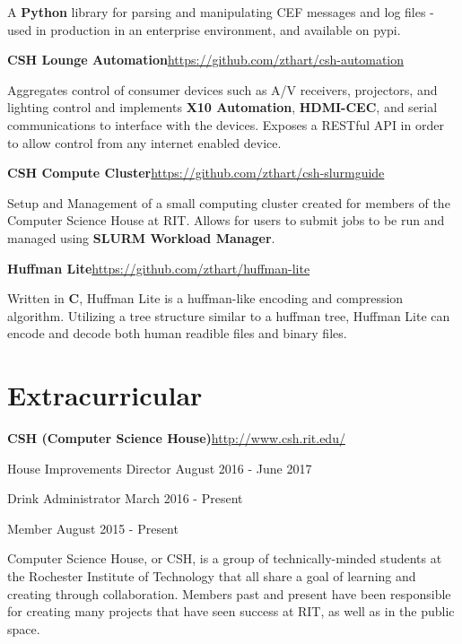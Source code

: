 \documentclass[margin,line]{resume}
\newcommand{\rurl}[1]{\hfill {\footnotesize \url{#1}}}
\begin{document}
\begin{resume}
\begin{asparablank}
		\small A \textbf{Python} library for parsing and manipulating CEF messages and log files - used in production in an enterprise environment, and available on pypi.
		\normalsize
		\\
		\item {\bf CSH Lounge Automation}\rurl{https://github.com/zthart/csh-automation}

		\small Aggregates control of consumer devices such as A/V receivers, projectors, and lighting control and implements \textbf{X10 Automation}, \textbf{HDMI-CEC}, and serial communications to interface with the devices. Exposes a RESTful API in order to allow control from any internet enabled device.
		\normalsize
        \\
		\item {\bf CSH Compute Cluster}\rurl{https://github.com/zthart/csh-slurmguide}

		\small Setup and Management of a small computing cluster created for members of the Computer Science House at RIT. Allows for users to submit jobs to be run and managed using \textbf{SLURM Workload Manager}.
		\\
		\item {\bf Huffman Lite}\rurl{https://github.com/zthart/huffman-lite}

		\small Written in \textbf{C}, Huffman Lite is a huffman-like encoding and compression algorithm. Utilizing a tree structure similar to a huffman tree, Huffman Lite can encode and decode both human readible files and binary files.
		\normalsize
	\end{asparablank}
    
\section{\mysidestyle Extracurricular}
	\begin{asparablank}
		\item {\bf CSH ({\small Computer Science House})}\rurl{http://www.csh.rit.edu/}
		\small	\item House Improvements Director \hfill August 2016 - June 2017
        \small  \item Drink Administrator \hfill March 2016 - Present
        \small  \item Member \hfill August 2015 - Present
        \linebreak
        
        \small Computer Science House, or CSH, is a group of technically-minded students at the Rochester Institute of Technology that all share a goal of learning and creating through collaboration. Members past and present have been responsible for creating many projects that have seen success at RIT, as well as in the public space.
	\end{asparablank}
    

\end{resume}
\end{document}
